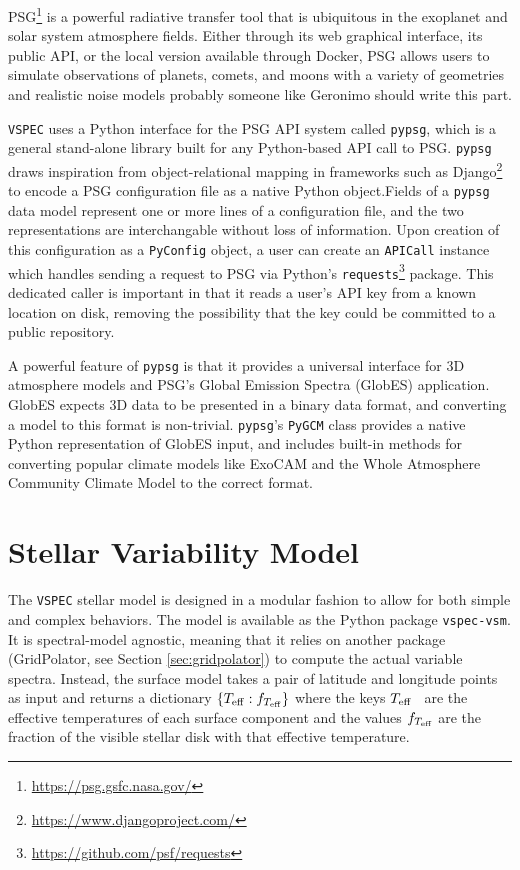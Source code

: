 \documentclass[twocolumn]{aastex631}
\newcommand{\teff}{$T_{\rm eff}$}
\newcommand{\TJ}[1]{\textcolor{tedcommentcolor}{#1}}
\newcommand{\vspec}[1]{\texttt{VSPEC}#1}
\begin{document}
PSG\footnote{\url{https://psg.gsfc.nasa.gov/}} \citep{villanueva2018} is a powerful radiative transfer tool that is ubiquitous in the exoplanet and solar system atmosphere fields. Either through its web graphical interface, its public API, or the local version available through Docker, PSG allows users to simulate observations of planets, comets, and moons with a variety of geometries and realistic noise models \TJ{probably someone like Geronimo should write this part}.

\vspec{} uses a Python interface for the PSG API system called \texttt{pypsg}, which is a general stand-alone library built for any Python-based API call to PSG. \texttt{pypsg} draws inspiration from object-relational mapping in frameworks such as Django\footnote{\url{https://www.djangoproject.com/}} to encode a PSG configuration file as a native Python object.Fields of a \texttt{pypsg} data model represent one or more lines of a configuration file, and the two representations are interchangable without loss of information. Upon creation of this configuration as a \texttt{PyConfig} object, a user can create an \texttt{APICall} instance which handles sending a request to PSG via Python's \texttt{requests}\footnote{\url{https://github.com/psf/requests}} package. This dedicated caller is important in that it reads a user's API key from a known location on disk, removing the possibility that the key
could be committed to a public repository.

A powerful feature of \texttt{pypsg} is that it provides a universal interface for 3D atmosphere models and PSG's Global Emission Spectra (GlobES) application.
GlobES expects 3D data to be presented in a binary data format, and converting a model to this format is non-trivial. \texttt{pypsg}'s \texttt{PyGCM} class provides a native Python representation of GlobES input, and includes built-in methods for converting popular climate models like ExoCAM \citep{wolf2022} and the Whole Atmosphere Community Climate Model \citep[WACCM,][]{marsh2013} to the correct format.

\section{Stellar Variability Model}
\label{sec:star}

The \vspec{} stellar model is designed in a modular fashion to allow for both simple and complex behaviors. The model is available as the Python package \texttt{vspec-vsm}. It is spectral-model agnostic, meaning that it relies on another package (GridPolator, see Section \ref{sec:gridpolator}) to compute the actual variable spectra. Instead, the surface model takes a pair of latitude and longitude points as input and returns a dictionary $\{ T_{\rm eff} : f_{T_{\rm eff}} \}$ where the keys \teff~ are the effective temperatures of each surface component and the values $f_{T_{\rm eff}}$ are the fraction of the visible stellar disk with that effective temperature.
\end{document}
